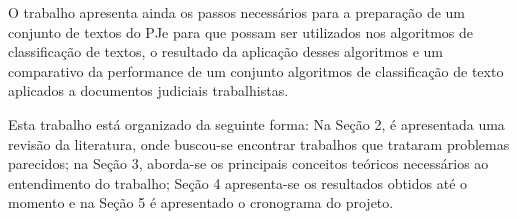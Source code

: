 O trabalho apresenta ainda os passos necessários para a preparação de um conjunto de textos do PJe para que possam ser utilizados nos algoritmos de classificação de textos, o resultado da aplicação desses algoritmos e um comparativo da performance de um conjunto algoritmos de classificação de texto aplicados a documentos judiciais trabalhistas. 





Esta trabalho está organizado da seguinte forma: Na Seção 2, é apresentada uma revisão da literatura, onde buscou-se encontrar trabalhos que trataram problemas parecidos; na Seção 3, aborda-se os principais conceitos teóricos necessários ao entendimento do trabalho; Seção 4 apresenta-se os resultados obtidos até o momento e na Seção 5 é apresentado o cronograma do projeto.
